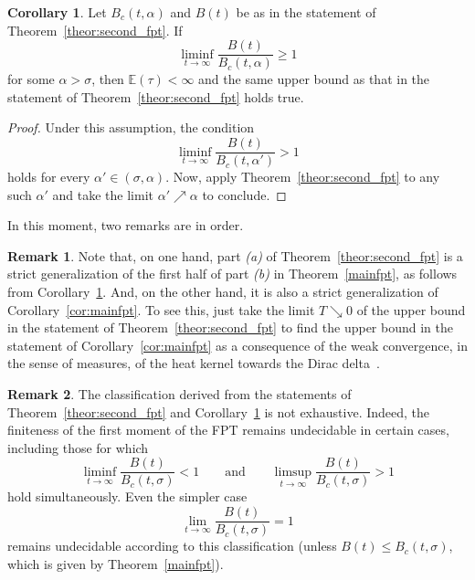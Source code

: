 \documentclass[12pt]{article}
\theoremstyle{definition}
\newtheorem{corollary}{Corollary}[theorem]
\newtheorem{remark}{Remark}[theorem]
\begin{document}
\begin{corollary}\label{cor:second_fpt}
Let $B_c(t,\alpha)$ and $B(t)$ be as in the statement of Theorem~\ref{theor:second_fpt}. If
$$
\liminf\limits_{t\rightarrow\infty}\dfrac{B(t)}{B_c(t,\alpha)} \ge 1
$$
for some $\alpha>\sigma$, then $\mathbb{E}(\tau)<\infty$ and the same upper bound as that in the statement of Theorem~\ref{theor:second_fpt} holds true.
\end{corollary}

\begin{proof}
Under this assumption, the condition
$$
\liminf\limits_{t\rightarrow\infty}\dfrac{B(t)}{B_c(t,\alpha')} > 1
$$
holds for every $\alpha' \in (\sigma, \alpha)$. Now, apply Theorem~\ref{theor:second_fpt} to any such $\alpha'$ and take the limit $\alpha' \nearrow \alpha$ to conclude.
\end{proof}

In this moment, two remarks are in order.

\begin{remark}\label{rem:tto0}
Note that, on one hand, part \textit{(a)} of Theorem~\ref{theor:second_fpt} is a strict generalization of the first half of part \textit{(b)} in Theorem~\ref{mainfpt}, as follows from Corollary~\ref{cor:second_fpt}. And, on the other hand, it is also a strict generalization of Corollary~\ref{cor:mainfpt}. To see this, just take the limit $T \searrow 0$ of the upper bound in the statement of Theorem~\ref{theor:second_fpt} to find the upper bound in the statement of Corollary~\ref{cor:mainfpt} as a consequence of the weak convergence, in the sense of measures, of the heat kernel towards the Dirac delta~\cite{evanspdes}.
\end{remark}

\begin{remark}
The classification derived from the statements of Theorem~\ref{theor:second_fpt} and Corollary~\ref{cor:second_fpt} is not exhaustive. Indeed, the finiteness of the first moment of the FPT remains undecidable in certain cases, including those for which $$\liminf\limits_{t\rightarrow\infty}\dfrac{B(t)}{B_c(t,\sigma)}<1 \qquad \text{and} \qquad \limsup\limits_{t\rightarrow\infty}\dfrac{B(t)}{B_c(t,\sigma)}>1$$ hold simultaneously. Even the simpler case $$\lim\limits_{t\rightarrow\infty}\dfrac{B(t)}{B_c(t,\sigma)}=1$$
remains undecidable according to this classification (unless $B(t) \le B_c(t,\sigma)$, which is given by Theorem~\ref{mainfpt}).
\end{remark}
\end{document}
